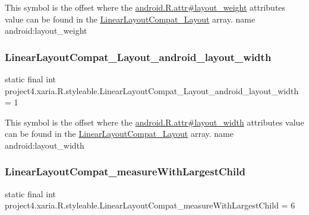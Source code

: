 This symbol is the offset where the \hyperlink{}{android.\+R.\+attr\#layout\+\_\+weight} attribute\textquotesingle{}s value can be found in the \hyperlink{classproject4_1_1xaria_1_1R_1_1styleable_abae4849d55752ff5e7c774316d11a406}{Linear\+Layout\+Compat\+\_\+\+Layout} array.  name android\+:layout\+\_\+weight \mbox{\label{classproject4_1_1xaria_1_1R_1_1styleable_a4640277fdb6931622906c6d4df4ca733}} 
\subsubsection{\texorpdfstring{Linear\+Layout\+Compat\+\_\+\+Layout\+\_\+android\+\_\+layout\+\_\+width}{LinearLayoutCompat\_Layout\_android\_layout\_width}}
{\footnotesize\ttfamily static final int project4.\+xaria.\+R.\+styleable.\+Linear\+Layout\+Compat\+\_\+\+Layout\+\_\+android\+\_\+layout\+\_\+width = 1\hspace{0.3cm}{\ttfamily [static]}}

This symbol is the offset where the \hyperlink{}{android.\+R.\+attr\#layout\+\_\+width} attribute\textquotesingle{}s value can be found in the \hyperlink{classproject4_1_1xaria_1_1R_1_1styleable_abae4849d55752ff5e7c774316d11a406}{Linear\+Layout\+Compat\+\_\+\+Layout} array.  name android\+:layout\+\_\+width \mbox{\label{classproject4_1_1xaria_1_1R_1_1styleable_a83b43869079dce397a9b632d885316f2}} 
\subsubsection{\texorpdfstring{Linear\+Layout\+Compat\+\_\+measure\+With\+Largest\+Child}{LinearLayoutCompat\_measureWithLargestChild}}
{\footnotesize\ttfamily static final int project4.\+xaria.\+R.\+styleable.\+Linear\+Layout\+Compat\+\_\+measure\+With\+Largest\+Child = 6\hspace{0.3cm}{\ttfamily [static]}}

